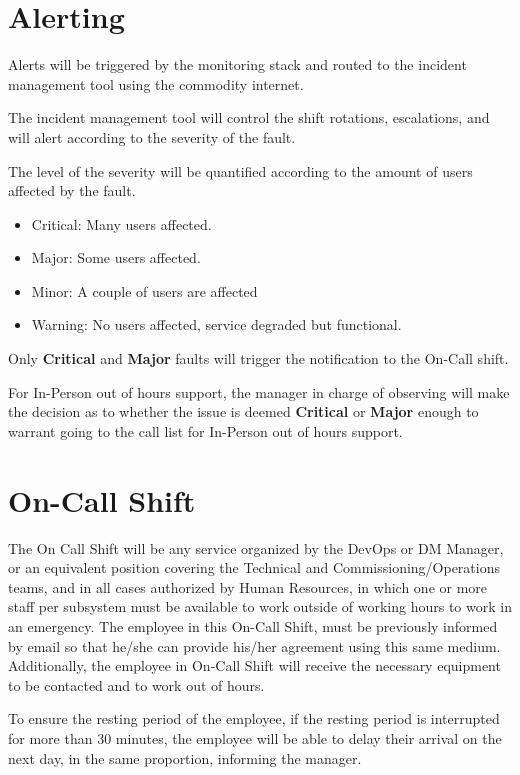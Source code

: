 \section{Alerting}

Alerts will be triggered by the monitoring stack and routed to the incident management tool using the commodity internet.

The incident management tool will control the shift rotations, escalations, and will alert according to the severity of the fault.

The level of the severity will be quantified according to the amount of users affected by the fault.

\begin{itemize}
    \item Critical: Many users affected.
    \item Major: Some users affected.
    \item Minor: A couple of users are affected
    \item Warning: No users affected, service degraded but functional.
\end{itemize}

Only \textbf{Critical} and \textbf{Major} faults will trigger the notification to the On-Call shift.

For In-Person out of hours support, the manager in charge of observing will make the decision as to whether the issue is deemed \textbf{Critical} or \textbf{Major} enough to warrant going to the call list for In-Person out of hours support.


\section{On-Call Shift}

The On Call Shift will be any service organized by the DevOps or DM Manager, or an equivalent position covering the Technical and Commissioning/Operations teams, and in all cases authorized by Human Resources, in which one or more staff per subsystem must be available to work outside of working hours to work in an emergency.
The employee in this On-Call Shift, must be previously informed by email so that he/she can provide his/her agreement using this same medium. Additionally, the employee in On-Call Shift will receive the necessary equipment to be contacted and to work out of hours.

To ensure the resting period of the employee, if the resting period is interrupted for more than 30 minutes, the employee will be able to delay their arrival on the next day, in the same proportion, informing the manager.

